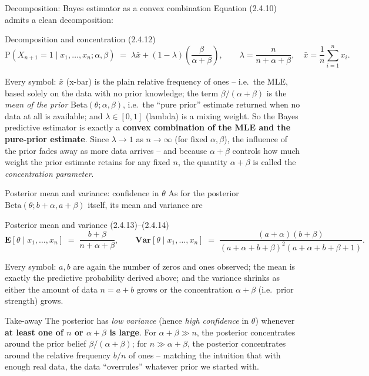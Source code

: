\documentclass[aspectratio=169,10pt]{beamer}
\begin{document}
\begin{frame}{Decomposition: Bayes estimator as a convex combination}
  Equation (2.4.10) admits a clean decomposition:
  \begin{block}{Decomposition and concentration (2.4.12)}
    \[
      \mathrm P(X_{n+1}=1\mid x_1,\ldots,x_n;\alpha,\beta) \;=\; \lambda\bar x+(1-\lambda)\left(\frac{\beta}{\alpha+\beta}\right),
      \qquad \lambda=\frac{n}{n+\alpha+\beta},\quad \bar x=\frac1n\sum_{i=1}^n x_i.
    \]
  \end{block}
  Every symbol: $\bar x$ (x-bar) is the plain relative frequency of ones --
  i.e.\ the MLE, based solely on the data with no prior knowledge; the term
  $\beta/(\alpha+\beta)$ is the \emph{mean of the prior}
  $\mathrm{Beta}(\theta;\alpha,\beta)$, i.e.\ the ``pure prior'' estimate
  returned when no data at all is available; and $\lambda\in[0,1]$ (lambda)
  is a mixing weight. So the Bayes predictive estimator is exactly a
  \textbf{convex combination of the MLE and the pure-prior estimate}. Since
  $\lambda\to 1$ as $n\to\infty$ (for fixed $\alpha,\beta$), the influence of
  the prior fades away as more data arrives -- and because $\alpha+\beta$
  controls how much weight the prior estimate retains for any fixed $n$,
  the quantity $\alpha+\beta$ is called the \emph{concentration parameter}.
\end{frame}

\begin{frame}{Posterior mean and variance: confidence in $\theta$}
  As for the posterior $\mathrm{Beta}(\theta;b+\alpha,a+\beta)$ itself, its
  mean and variance are
  \begin{block}{Posterior mean and variance (2.4.13)--(2.4.14)}
    \[
      \mathbf E[\theta\mid x_1,\ldots,x_n] \;=\; \frac{b+\beta}{n+\alpha+\beta},
      \qquad
      \mathbf{Var}[\theta\mid x_1,\ldots,x_n] \;=\; \frac{(a+\alpha)(b+\beta)}{(a+\alpha+b+\beta)^2(a+\alpha+b+\beta+1)}.
    \]
  \end{block}
  Every symbol: $a,b$ are again the number of zeros and ones observed; the
  mean is exactly the predictive probability derived above; and the
  variance shrinks as either the amount of data $n=a+b$ grows or the
  concentration $\alpha+\beta$ (i.e.\ prior strength) grows.

  \begin{block}{Take-away}
    The posterior has \emph{low variance} (hence \emph{high confidence} in
    $\theta$) whenever \textbf{at least one of $n$ or $\alpha+\beta$ is
    large}. For $\alpha+\beta\gg n$, the posterior concentrates around the
    prior belief $\beta/(\alpha+\beta)$; for $n\gg\alpha+\beta$, the
    posterior concentrates around the relative frequency $b/n$ of ones --
    matching the intuition that with enough real data, the data
    ``overrules'' whatever prior we started with.
  \end{block}
\end{frame}
\end{document}
